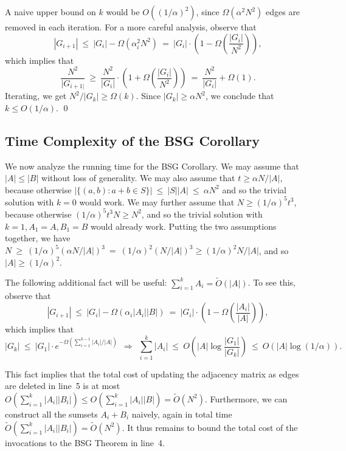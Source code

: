\documentclass[11pt]{article}
\newcommand{\OO}{\widetilde{O}}
\begin{document}
{A naive upper bound on $k$ would be $O((1/\alpha)^2)$, since $\Omega(\alpha^2 N^2)$ edges are removed in each iteration.
For a more careful analysis, observe that
$$|G_{i+1}| \:\leq\:  |G_i| - \Omega(\alpha_i^2 N^2)
           \:=\: |G_i| \cdot \left(1 - \Omega\left(\frac{|G_i|}{N^2}\right)\right),$$
which implies that
$$ \frac{N^2}{|G_{i+1|}} \:\geq\:  \frac{N^2}{|G_i|} \cdot \left(1 + \Omega\left( \frac{|G_i|}{N^2}\right)\right)
                 \:=\:  \frac{N^2}{|G_i|} + \Omega(1).$$
Iterating, we get $N^2/|G_k| \geq  \Omega(k)$.
Since $|G_k| \geq  \alpha N^2$, we conclude that $k \leq  O(1/\alpha)$.
\qed




\subsection{Time Complexity of the BSG Corollary}\label{sec-bsg-corollary-time}

We now analyze the running time for the BSG Corollary.
We may assume that $|A|\le |B|$ without loss of generality.
We may also assume that $t\ge \alpha N/|A|$,
because otherwise
$|\{(a,b):a+b\in S\}|\:\le\: |S||A| \:\le\: \alpha N^2$ and so the trivial solution with
$k=0$ would work.
We may further assume that $N\ge (1/\alpha)^5 t^3$,
because otherwise $(1/\alpha)^5 t^3 N \ge N^2$, and so the trivial
solution with $k=1,A_1=A,B_1=B$ would already work.
Putting the two assumptions together, we have
$N\:\ge\: (1/\alpha)^5 (\alpha N/|A|)^3 \:=\: (1/\alpha)^2 (N/|A|)^3\ge (1/\alpha)^2 N/|A|$, and
so $|A|\ge (1/\alpha)^2$.

The following additional fact will be useful:
$\sum_{i=1}^k A_i = \OO(|A|)$.
To see this, observe that
$$ |G_{i+1}| \:\leq\:  |G_i| - \Omega(\alpha_i |A_i||B|)
             \: =\:  |G_i| \cdot \left(1 - \Omega\left(\frac{|A_i|}{|A|}\right)\right),$$
which implies that
$$|G_k| \:\leq\:  |G_1| \cdot e^{-\Omega( \sum_{i=1}^{k-1} |A_i|/|A| )}\ \ \Longrightarrow\ \
\sum_{i=1}^k |A_i| \:\leq\:  O\left(|A|\log\frac{|G_1|}{|G_k|}\right)
                    \:\leq\:  O(|A| \log(1/\alpha)).$$

This fact implies that the total cost of updating the
adjacency matrix as edges are deleted in line~5 is
at most $O(\sum_{i=1}^k |A_i||B_i|) \le O(\sum_{i=1}^k |A_i||B|) = \OO(N^2)$.
Furthermore, we can construct all the
sumsets $A_i+B_i$ naively, again in total time
$\OO(\sum_{i=1}^k |A_i||B_i|) = \OO(N^2)$.
It thus remains to bound the total cost of the invocations
to the BSG Theorem in line~4.

}
\end{document}

